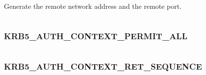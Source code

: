 \documentclass[letterpaper,10pt,english]{sphinxmanual}
\begin{document}
Generate the remote network address and the remote port.

\begin{tabulary}{\linewidth}{|L|L|}
\hline

 & 
\\
\hline\end{tabulary}



\subsubsection{KRB5\_AUTH\_CONTEXT\_PERMIT\_ALL}
\label{appdev/refs/macros/KRB5_AUTH_CONTEXT_PERMIT_ALL:krb5-auth-context-permit-all}\label{appdev/refs/macros/KRB5_AUTH_CONTEXT_PERMIT_ALL:krb5-auth-context-permit-all-data}\label{appdev/refs/macros/KRB5_AUTH_CONTEXT_PERMIT_ALL::doc}

\begin{fulllineitems}
\label{appdev/refs/macros/KRB5_AUTH_CONTEXT_PERMIT_ALL:KRB5_AUTH_CONTEXT_PERMIT_ALL}
\end{fulllineitems}


\begin{tabulary}{\linewidth}{|L|L|}
\hline

 & 
\\
\hline\end{tabulary}



\subsubsection{KRB5\_AUTH\_CONTEXT\_RET\_SEQUENCE}
\label{appdev/refs/macros/KRB5_AUTH_CONTEXT_RET_SEQUENCE::doc}\label{appdev/refs/macros/KRB5_AUTH_CONTEXT_RET_SEQUENCE:krb5-auth-context-ret-sequence}\label{appdev/refs/macros/KRB5_AUTH_CONTEXT_RET_SEQUENCE:krb5-auth-context-ret-sequence-data}

\begin{fulllineitems}
\label{appdev/refs/macros/KRB5_AUTH_CONTEXT_RET_SEQUENCE:KRB5_AUTH_CONTEXT_RET_SEQUENCE}
\end{fulllineitems}
\end{document}
